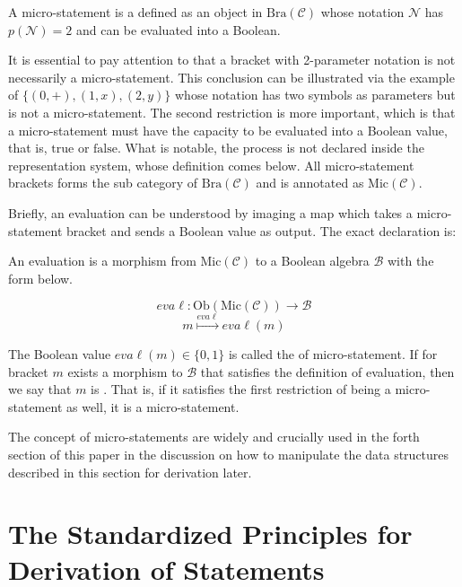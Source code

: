 \documentclass{article}
\begin{document}
 A micro-statement is a defined as an object in \(\text{Bra}(\mathcal{C})\) whose notation \(\mathcal{N}\) has \(\mathit{p}(\mathcal{N})=2\) and can be evaluated into a Boolean.

It is essential to pay attention to that a bracket with 2-parameter notation is not necessarily a micro-statement. This conclusion can be illustrated via the example of \(\{(0,+),(1,x),(2,y)\}\) whose notation has two symbols as parameters but is not a micro-statement. The second restriction is more important, which is that a micro-statement must have the capacity to be evaluated into a Boolean value, that is, \(\text{true}\) or \(\text{false}\). What is notable, the  process is not declared inside the representation system, whose definition comes below. All micro-statement brackets forms the sub category of \(\text{Bra}(\mathcal{C})\) and is annotated as \(\text{Mic}(\mathcal{C})\).

 Briefly, an evaluation can be understood by imaging a map which takes a micro-statement bracket and sends a Boolean value as output. The exact declaration is:

 An evaluation is a morphism from \(\text{Mic}(\mathcal{C})\) to a Boolean algebra \(\mathcal{B}\) with the form below.

\[\mathit{e}\mathit{v}\mathit{a}\ell :\text{Ob}(\text{Mic}(\mathcal{C}))\to \mathcal{B}\]
\[\mathit{m}\overset{\mathit{e}\mathit{v}\mathit{a}\ell }{\mapsto }\mathit{e}\mathit{v}\mathit{a}\ell (\mathit{m})\]

The Boolean value \(\mathit{e}\mathit{v}\mathit{a}\ell (\mathit{m})\in \{0,1\}\) is called the  of micro-statement. If for bracket \(\mathit{m}\) exists a morphism to \(\mathcal{B}\) that satisfies the definition of evaluation, then we say that \(\mathit{m}\) is . That is, if it satisfies the first restriction of being a micro-statement as well, it is a micro-statement.

The concept of micro-statements are widely and crucially used in the forth section of this paper in the discussion on how to manipulate the data structures described in this section for derivation later.

\section*{The Standardized Principles for Derivation of Statements}
\end{document}
